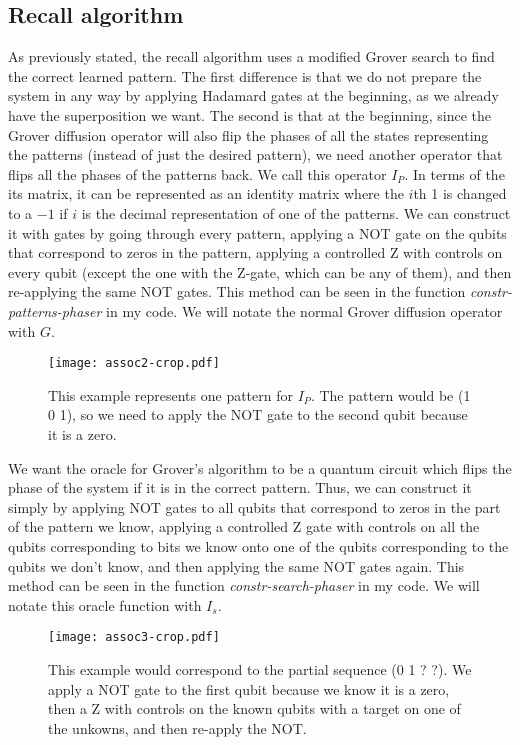 \documentclass[11pt]{article}
\begin{document}
\newpage

\subsection{Recall algorithm}

As previously stated, the recall algorithm uses a modified Grover search to find the correct learned pattern. The first difference is that we do not prepare the system in any way by applying Hadamard gates at the beginning, as we already have the superposition we want. The second is that at the beginning, since the Grover diffusion operator will also flip the phases of all the states representing the patterns (instead of just the desired pattern), we need another operator that flips all the phases of the patterns back. We call this operator $I_P$. In terms of the its matrix, it can be represented as an identity matrix where the $i$th 1 is changed to a $-1$ if $i$ is the decimal representation of one of the patterns. We can construct it with gates by going through every pattern, applying a NOT gate on the qubits that correspond to zeros in the pattern, applying a controlled Z with controls on every qubit (except the one with the Z-gate, which can be any of them), and then re-applying the same NOT gates. This method can be seen in the function \textit{constr-patterns-phaser} in my code. We will notate the normal Grover diffusion operator with $G$.

\begin{figure}[!htb]
\centering
\texttt{[image: assoc2-crop.pdf]}
\caption{This example represents one pattern for $I_P$. The pattern would be (1 0 1), so we need to apply the NOT gate to the second qubit because it is a zero.}
\label{fig:digraph2}
\end{figure}

We want the oracle for Grover's algorithm to be a quantum circuit which flips the phase of the system if it is in the correct pattern. Thus, we can construct it simply by applying NOT gates to all qubits that correspond to zeros in the part of the pattern we know, applying a controlled Z gate with controls on all the qubits corresponding to bits we know onto one of the qubits corresponding to the qubits we don't know, and then applying the same NOT gates again. This method can be seen in the function \textit{constr-search-phaser} in my code. We will notate this oracle function with $I_s$.


\begin{figure}[!htb]
\centering
\texttt{[image: assoc3-crop.pdf]}
\caption{This example would correspond to the partial sequence (0 1 ? ?). We apply a NOT gate to the first qubit because we know it is a zero, then a Z with controls on the known qubits with a target on one of the unkowns, and then re-apply the NOT.}
\label{fig:digraph3}
\end{figure}
\end{document}
